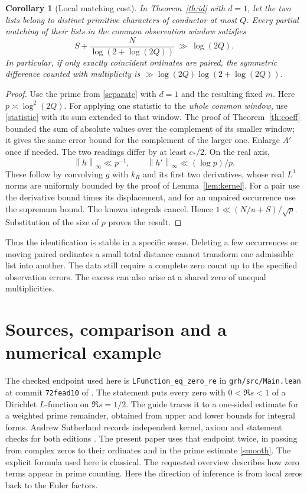 \documentclass[11pt]{article}
\newtheorem{corollary}[theorem]{Corollary}
\newcommand{\norm}[1]{\left\lVert#1\right\rVert}
\begin{document}
\begin{corollary}[Local matching cost]\label{th:match}
In Theorem~\ref{th:id} with $d=1$, let the two lists belong to distinct primitive characters of conductor at most $Q$. Every partial matching of their lists in the common observation window satisfies
\[
       S+\frac{N}{\log(2+\log(2Q))}\ \gg\ \log(2Q).
\]
In particular, if only exactly coincident ordinates are paired, the symmetric difference counted with multiplicity is $\gg\log(2Q)\log(2+\log(2Q))$.
\end{corollary}
\begin{proof}
Use the prime from \eqref{separate} with $d=1$ and the resulting fixed $m$. Here $p\asymp \log^2(2Q)$. For applying one statistic to the \emph{whole common window}, use \eqref{statistic} with its sum extended to that window. The proof of Theorem~\ref{th:coeff} bounded the sum of absolute values over the complement of its smaller window; it gives the same error bound for the complement of the larger one. Enlarge $A'$ once if needed. The two readings differ by at least $c_*/2$. On the real axis,
\[
      \norm h_\infty\ll p^{-1},\qquad
      \norm{h'}_\infty\ll (\log p)/p .
\]
These follow by convolving $g$ with $k_R$ and its first two derivatives, whose real $L^1$ norms are uniformly bounded by the proof of Lemma~\ref{lem:kernel}. For a pair use the derivative bound times its displacement, and for an unpaired occurrence use the supremum bound. The known integrals cancel. Hence
$1\ll (N/u+S)/\sqrt p$. Substitution of the size of $p$ proves the result.
\end{proof}

Thus the identification is stable in a specific sense. Deleting a few occurrences or moving paired ordinates a small total distance cannot transform one admissible list into another. The data still require a complete zero count up to the specified observation errors. The excess can also arise at a shared zero of unequal multiplicities.

\section{Sources, comparison and a numerical example}
The checked endpoint used here is \texttt{LFunction\_eq\_zero\_re} in \texttt{grh/src/Main.lean} at commit \texttt{72fead10} of \cite{Lean}. The statement puts every zero with $0<\Re s<1$ of a Dirichlet $L$-function on $\Re s=1/2$. The guide traces it to a one-sided estimate for a weighted prime remainder, obtained from upper and lower bounds for integral forms. Andrew Sutherland records independent kernel, axiom and statement checks for both editions \cite{Sutherland}. The present paper uses that endpoint twice, in passing from complex zeros to their ordinates and in the prime estimate \eqref{smooth}. The explicit formula used here is classical. The requested overview \cite{Wiki} describes how zero terms appear in prime counting. Here the direction of inference is from local zeros back to the Euler factors.
\end{document}
